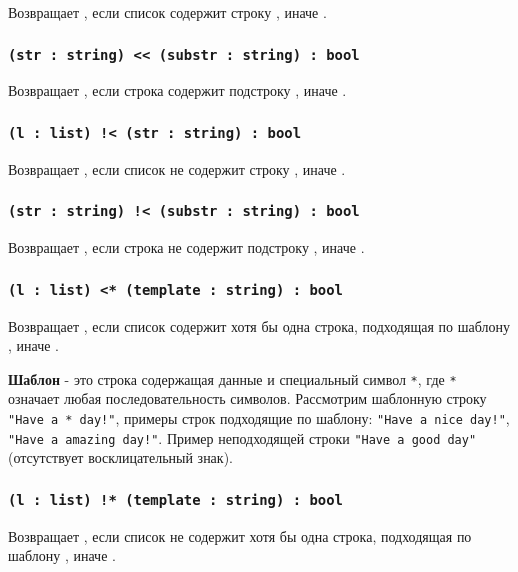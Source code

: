 Возвращает \true{}, если список  содержит строку , иначе \false{}.

\subsubsection{\lstinline`(str : string) << (substr : string) : bool`}

Возвращает \true{}, если строка  содержит подстроку , иначе \false{}.

\subsubsection{\lstinline`(l : list) !< (str : string) : bool`}

Возвращает \true{}, если список  не содержит строку , иначе \false{}.

\subsubsection{\lstinline`(str : string) !< (substr : string) : bool`}

Возвращает \true{}, если строка  не содержит подстроку , иначе \false{}.

\subsubsection{\lstinline`(l : list) <* (template : string) : bool`}

Возвращает \true{}, если список  содержит хотя бы одна строка, подходящая по шаблону , иначе \false{}.

{\bf Шаблон} - это строка содержащая данные и специальный символ \lstinline`*`, где \lstinline`*` означает любая последовательность символов. Рассмотрим шаблонную строку \lstinline`"Have a * day!"`, примеры строк подходящие по шаблону: \lstinline`"Have a nice day!"`, \lstinline`"Have a amazing day!"`. Пример неподходящей строки \lstinline`"Have a good day"` (отсутствует восклицательный знак).

\subsubsection{\lstinline`(l : list) !* (template : string) : bool`}

Возвращает \true{}, если список  не содержит хотя бы одна строка, подходящая по шаблону , иначе \false{}.

